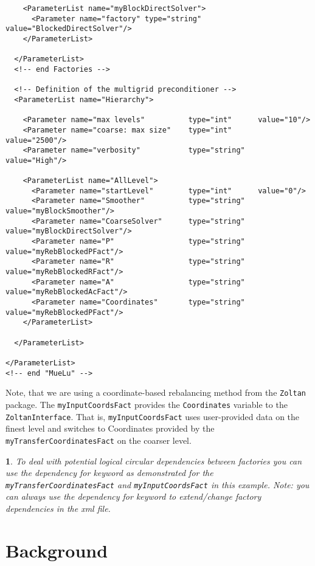 \documentclass[10pt,fleqn]{book}
\newtheorem*{mycomment}{\ding{42}}
\begin{document}
\begin{lstlisting}
    <ParameterList name="myBlockDirectSolver">
      <Parameter name="factory" type="string" value="BlockedDirectSolver"/>
    </ParameterList>

  </ParameterList>
  <!-- end Factories -->

  <!-- Definition of the multigrid preconditioner -->
  <ParameterList name="Hierarchy">

    <Parameter name="max levels"          type="int"      value="10"/>
    <Parameter name="coarse: max size"    type="int"      value="2500"/>
    <Parameter name="verbosity"           type="string"   value="High"/>

    <ParameterList name="AllLevel">
      <Parameter name="startLevel"        type="int"      value="0"/>
      <Parameter name="Smoother"          type="string"   value="myBlockSmoother"/>
      <Parameter name="CoarseSolver"      type="string"   value="myBlockDirectSolver"/>
      <Parameter name="P"                 type="string"   value="myRebBlockedPFact"/>
      <Parameter name="R"                 type="string"   value="myRebBlockedRFact"/>
      <Parameter name="A"                 type="string"   value="myRebBlockedAcFact"/>
      <Parameter name="Coordinates"       type="string"   value="myRebBlockedPFact"/>
    </ParameterList>

  </ParameterList>

</ParameterList>
<!-- end "MueLu" -->
\end{lstlisting}

Note, that we are using a coordinate-based rebalancing method from the \texttt{Zoltan} package. The \texttt{myInputCoordsFact} provides the \texttt{Coordinates} variable to the \texttt{ZoltanInterface}. That is, \texttt{myInputCoordsFact} uses user-provided data on the finest level and switches to Coordinates provided by the \texttt{myTransferCoordinatesFact} on the coarser level.

\begin{mycomment}
To deal with potential logical circular dependencies between factories you can use the \textit{dependency for} keyword as demonstrated for the \texttt{myTransferCoordinatesFact} and \texttt{myInputCoordsFact} in this example. Note: you can always use the \textit{dependency for} keyword to extend/change factory dependencies in the xml file.
\end{mycomment}



\section{Background}
\end{document}
